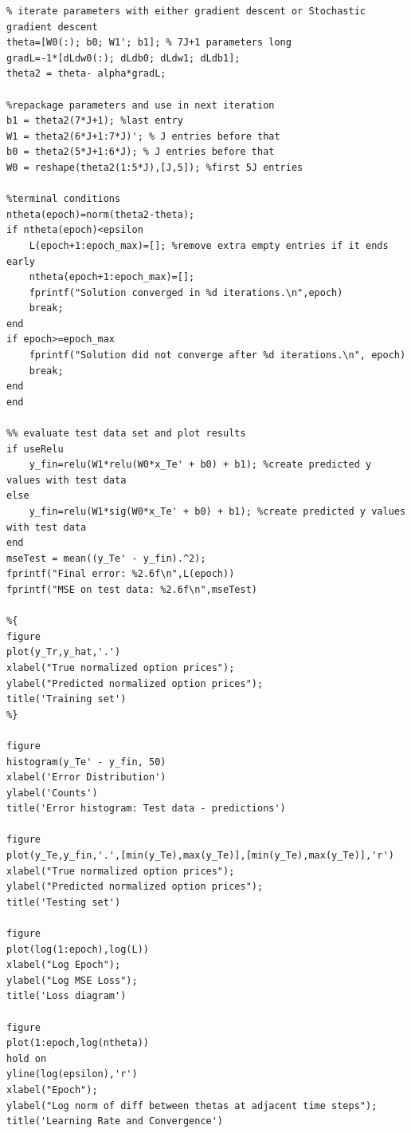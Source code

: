 \documentclass[reqno,14pt]{amsart}
\theoremstyle{plain}
\theoremstyle{definition}
\theoremstyle{remark}
\begin{document}
\begin{lstlisting}
% iterate parameters with either gradient descent or Stochastic gradient descent
theta=[W0(:); b0; W1'; b1]; % 7J+1 parameters long
gradL=-1*[dLdw0(:); dLdb0; dLdw1; dLdb1];
theta2 = theta- alpha*gradL; 

%repackage parameters and use in next iteration
b1 = theta2(7*J+1); %last entry
W1 = theta2(6*J+1:7*J)'; % J entries before that
b0 = theta2(5*J+1:6*J); % J entries before that
W0 = reshape(theta2(1:5*J),[J,5]); %first 5J entries

%terminal conditions
ntheta(epoch)=norm(theta2-theta);
if ntheta(epoch)<epsilon
    L(epoch+1:epoch_max)=[]; %remove extra empty entries if it ends early
    ntheta(epoch+1:epoch_max)=[]; 
    fprintf("Solution converged in %d iterations.\n",epoch)
    break;
end
if epoch>=epoch_max
    fprintf("Solution did not converge after %d iterations.\n", epoch)
    break;
end
end

%% evaluate test data set and plot results
if useRelu
    y_fin=relu(W1*relu(W0*x_Te' + b0) + b1); %create predicted y values with test data
else
    y_fin=relu(W1*sig(W0*x_Te' + b0) + b1); %create predicted y values with test data
end
mseTest = mean((y_Te' - y_fin).^2);
fprintf("Final error: %2.6f\n",L(epoch))
fprintf("MSE on test data: %2.6f\n",mseTest)

%{
figure
plot(y_Tr,y_hat,'.')
xlabel("True normalized option prices");
ylabel("Predicted normalized option prices");
title('Training set')
%}

figure
histogram(y_Te' - y_fin, 50)
xlabel('Error Distribution')
ylabel('Counts')
title('Error histogram: Test data - predictions')

figure
plot(y_Te,y_fin,'.',[min(y_Te),max(y_Te)],[min(y_Te),max(y_Te)],'r')
xlabel("True normalized option prices");
ylabel("Predicted normalized option prices");
title('Testing set')

figure
plot(log(1:epoch),log(L))
xlabel("Log Epoch");
ylabel("Log MSE Loss");
title('Loss diagram')

figure
plot(1:epoch,log(ntheta))
hold on
yline(log(epsilon),'r')
xlabel("Epoch");
ylabel("Log norm of diff between thetas at adjacent time steps");
title('Learning Rate and Convergence')
\end{lstlisting}
\end{document}
